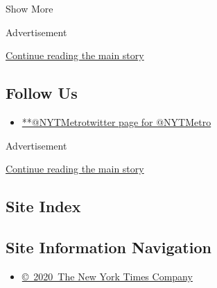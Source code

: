 Show More

Advertisement

\protect\hyperlink{after-mid2}{Continue reading the main story}

\hypertarget{follow-us}{%
\subsection{Follow Us}\label{follow-us}}

\begin{itemize}
\tightlist
\item
  \href{https://twitter.com/NYTMetro}{**@NYTMetrotwitter page for
  @NYTMetro}
\end{itemize}

Advertisement

\protect\hyperlink{after-mktg}{Continue reading the main story}

\hypertarget{site-index}{%
\subsection{Site Index}\label{site-index}}

\hypertarget{site-information-navigation}{%
\subsection{Site Information
Navigation}\label{site-information-navigation}}

\begin{itemize}
\tightlist
\item
  \href{https://help.nytimes3xbfgragh.onion/hc/en-us/articles/115014792127-Copyright-notice}{©~2020~The
  New York Times Company}
\end{itemize}

